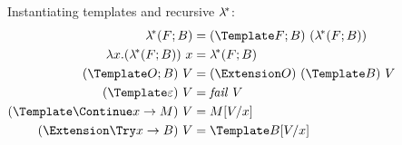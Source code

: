 \begin{figure}


Instantiating templates and recursive $\lambda^{\!*}$:
\begin{align*}
  \lamstar (F; B)
  &=
  (\Template F; B) ~ (\lamstar (F; B))
  \\
  \lambda x. (\lamstar (F; B)) ~ x
  &=
  \lamstar (F; B)
  \\
  (\Template O; B) ~ V
  &=
  (\Extension O) ~ (\Template B) ~ V
  \\
  (\Template \varepsilon) ~ V
  &=
  \mathit{fail}~V
  \\
  (\Template \Continue x \to M) ~ V
  &=
  M\subst{x}{V}
  \\
  (\Extension \Try x \to B) ~ V
  &=
  \Template B\subst{x}{V}
\end{align*}


\end{figure}
